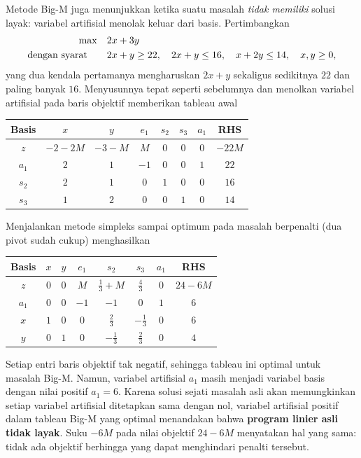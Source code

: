 Metode Big-M juga menunjukkan ketika suatu masalah \emph{tidak memiliki}
solusi layak: variabel artifisial menolak keluar dari basis. Pertimbangkan
\[
\begin{aligned}
\max\quad & 2x + 3y \\
\mbox{dengan syarat}\quad\quad & 2x + y \geq 22,\quad 2x + y \leq 16,\quad x + 2y \leq 14,\quad x,y\ge 0,
\end{aligned}
\]
yang dua kendala pertamanya mengharuskan $2x+y$ sekaligus sedikitnya $22$ dan
paling banyak $16$. Menyusunnya tepat seperti sebelumnya dan menolkan variabel
artifisial pada baris objektif memberikan tableau awal
\begin{center}
\renewcommand{\arraystretch}{1.3}\small\setlength{\tabcolsep}{4.5pt}
\begin{tabular}{c|cccccc|c}
\toprule
Basis & $x$ & $y$ & $e_1$ & $s_2$ & $s_3$ & $a_1$ & RHS\\
\midrule
$z$   & $-2-2M$ & $-3-M$ & $M$ & $0$ & $0$ & $0$ & $-22M$\\
\midrule
$a_1$ & $2$ & $1$ & $-1$ & $0$ & $0$ & $1$ & $22$\\
$s_2$ & $2$ & $1$ & $0$ & $1$ & $0$ & $0$ & $16$\\
$s_3$ & $1$ & $2$ & $0$ & $0$ & $1$ & $0$ & $14$\\
\bottomrule
\end{tabular}
\end{center}
Menjalankan metode simpleks sampai optimum pada masalah berpenalti (dua pivot
sudah cukup) menghasilkan
\begin{center}
\renewcommand{\arraystretch}{1.3}\small\setlength{\tabcolsep}{4.5pt}
\begin{tabular}{c|cccccc|c}
\toprule
Basis & $x$ & $y$ & $e_1$ & $s_2$ & $s_3$ & $a_1$ & RHS\\
\midrule
\rowcolor{algleave!15}$z$ & $0$ & $0$ & $M$ & $\tfrac13+M$ & $\tfrac43$ & $0$ & $24-6M$\\
\midrule
$a_1$ & $0$ & $0$ & $-1$ & $-1$ & $0$ & $1$ & $6$\\
$x$   & $1$ & $0$ & $0$ & $\tfrac23$ & $-\tfrac13$ & $0$ & $6$\\
$y$   & $0$ & $1$ & $0$ & $-\tfrac13$ & $\tfrac23$ & $0$ & $4$\\
\bottomrule
\end{tabular}
\end{center}
Setiap entri baris objektif tak negatif, sehingga tableau ini optimal untuk
masalah Big-M. Namun, variabel artifisial $a_1$ masih menjadi variabel basis
dengan nilai positif $a_1 = 6$. Karena solusi sejati masalah asli akan
memungkinkan setiap variabel artifisial ditetapkan sama dengan nol, variabel
artifisial positif dalam tableau Big-M yang optimal menandakan bahwa
\textbf{program linier asli tidak layak}. Suku $-6M$ pada nilai objektif
$24-6M$ menyatakan hal yang sama: tidak ada objektif berhingga yang dapat
menghindari penalti tersebut.

